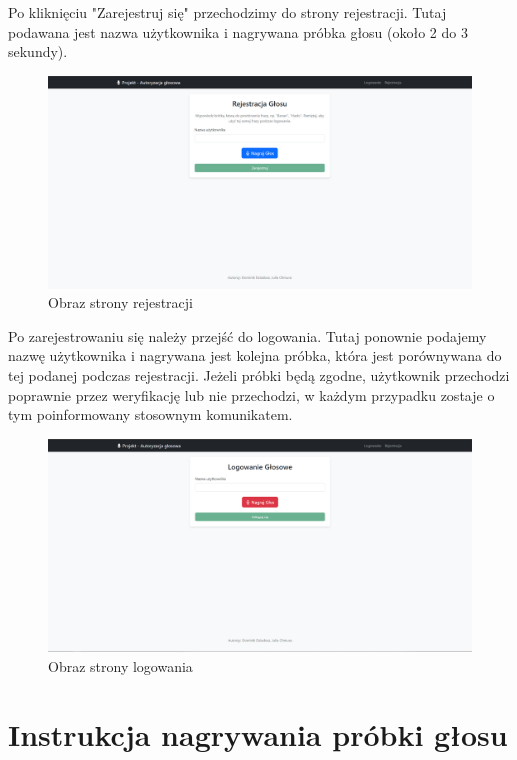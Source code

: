 Po kliknięciu "Zarejestruj się" przechodzimy do strony rejestracji. Tutaj podawana jest nazwa użytkownika i nagrywana próbka głosu (około 2 do 3 sekundy). 

\begin{figure}[H]
	\centering
	\includegraphics[width=\linewidth]{src/images/nagranie_probki_glosu.png}
	\caption{Obraz strony rejestracji}
\end{figure}

Po zarejestrowaniu się należy przejść do logowania. Tutaj ponownie podajemy nazwę użytkownika i nagrywana jest kolejna próbka, która jest porównywana do tej podanej podczas rejestracji. Jeżeli próbki będą zgodne, użytkownik przechodzi poprawnie przez weryfikację lub nie przechodzi, w każdym przypadku zostaje o tym poinformowany stosownym komunikatem. 

\begin{figure}[H]
	\centering
	\includegraphics[width=\linewidth]{src/images/weryfikacja_probki_glosu.png}
	\caption{Obraz strony logowania}
\end{figure}

\section{Instrukcja nagrywania próbki głosu}



